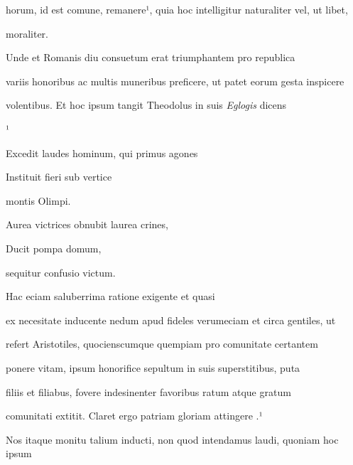 

horum, id est comune, remanere¹, quia hoc intelligitur naturaliter vel, ut libet,

\splitlines

moraliter. 

\indentK Unde et Romanis diu consuetum erat triumphantem pro republica

\fulllines

variis honoribus ac multis muneribus preficere, ut patet eorum gesta inspicere

volentibus. Et hoc ipsum tangit Theodolus in suis \textit{Eglogis} dicens

\splitlines

¹

\indentKcyt Excedit laudes hominum, qui primus agones

\indentKcyt Instituit fieri sub vertice

\splitlines

\indentKcyt \phantom{Instituit fieri sub vertice }montis Olimpi.	

\indentKcyt Aurea victrices obnubit laurea crines,

\indentKcyt Ducit pompa domum,

\splitlines

\indentKcyt \phantom{Ducit pompa domum, }sequitur confusio victum.

\indentK Hac eciam saluberrima ratione exigente et quasi

\fulllines

ex necesitate inducente nedum apud fideles verumeciam et circa gentiles, ut

refert Aristotiles, quocienscumque quempiam pro comunitate certantem 

 ponere vitam, ipsum honorifice sepultum in suis superstitibus, puta

filiis et filiabus, fovere indesinenter favoribus ratum atque gratum

comunitati extitit. Claret ergo patriam  gloriam attingere .¹

\indentP Nos itaque monitu talium inducti, non quod intendamus laudi, quoniam hoc ipsum

